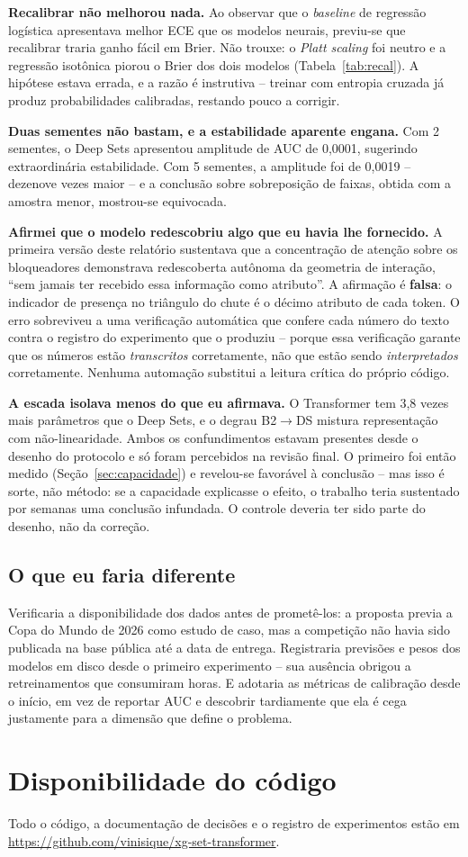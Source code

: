 \documentclass[12pt]{article}
\begin{document}
\textbf{Recalibrar não melhorou nada.} Ao observar que o
\emph{baseline} de regressão logística apresentava melhor ECE que os modelos
neurais, previu-se que recalibrar traria ganho fácil em Brier. Não trouxe: o
\emph{Platt scaling} foi neutro e a regressão isotônica piorou o Brier dos dois
modelos (Tabela~\ref{tab:recal}). A hipótese estava errada, e a razão é
instrutiva -- treinar com entropia cruzada já produz probabilidades calibradas,
restando pouco a corrigir.

\textbf{Duas sementes não bastam, e a estabilidade aparente engana.} Com 2
sementes, o Deep Sets apresentou amplitude de AUC de 0,0001, sugerindo
extraordinária estabilidade. Com 5 sementes, a amplitude foi de 0,0019 -- dezenove
vezes maior -- e a conclusão sobre sobreposição de faixas, obtida com a amostra
menor, mostrou-se equivocada.

\textbf{Afirmei que o modelo redescobriu algo que eu havia lhe fornecido.} A
primeira versão deste relatório sustentava que a concentração de atenção sobre os
bloqueadores demonstrava redescoberta autônoma da geometria de interação, ``sem
jamais ter recebido essa informação como atributo''. A afirmação é
\textbf{falsa}: o indicador de presença no triângulo do chute é o décimo atributo
de cada token. O erro sobreviveu a uma verificação automática que confere cada
número do texto contra o registro do experimento que o produziu -- porque essa
verificação garante que os números estão \emph{transcritos} corretamente, não que
estão sendo \emph{interpretados} corretamente. Nenhuma automação substitui a
leitura crítica do próprio código.

\textbf{A escada isolava menos do que eu afirmava.} O Transformer tem 3,8 vezes
mais parâmetros que o Deep Sets, e o degrau B2$\rightarrow$DS mistura
representação com não-linearidade. Ambos os confundimentos estavam presentes
desde o desenho do protocolo e só foram percebidos na revisão final. O primeiro
foi então medido (Seção~\ref{sec:capacidade}) e revelou-se favorável à conclusão
-- mas isso é sorte, não método: se a capacidade explicasse o efeito, o trabalho
teria sustentado por semanas uma conclusão infundada. O controle deveria ter sido
parte do desenho, não da correção.

\subsection{O que eu faria diferente}

Verificaria a disponibilidade dos dados antes de prometê-los: a proposta previa a
Copa do Mundo de 2026 como estudo de caso, mas a competição não havia sido
publicada na base pública até a data de entrega. Registraria previsões e pesos dos
modelos em disco desde o primeiro experimento -- sua ausência obrigou a
retreinamentos que consumiram horas. E adotaria as métricas de calibração desde o
início, em vez de reportar AUC e descobrir tardiamente que ela é cega justamente
para a dimensão que define o problema.

\section*{Disponibilidade do código}

Todo o código, a documentação de decisões e o registro de experimentos estão em
\url{https://github.com/vinisique/xg-set-transformer}.



\end{document}
